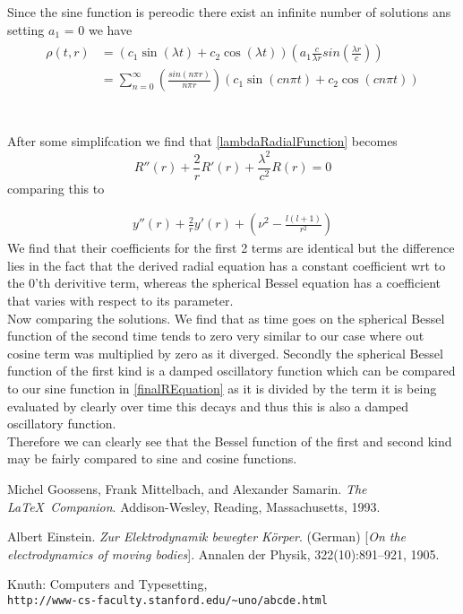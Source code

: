 \documentclass[10pt]{article}
\numberwithin{equation}{section}
\begin{document}
		Since the sine function is pereodic there exist an infinite number of solutions ans setting \(a_1\) = 0 we have
		\begin{align}\label{finalRho}
			\begin{split}
				\rho(t,r) &= (c_1 \sin(\lambda t) + c_2 \cos(\lambda t))\left(a_1\frac{c}{\lambda r}sin\left(\frac{\lambda r}{c}\right)\right)\\
				&= \sum_{n = 0}^{\infty} \left(\frac{sin\left(n \pi r\right)}{n \pi r}\right)\left(c_1 \sin(cn\pi t) + c_2 \cos(cn\pi t)\right)
			\end{split}
		\end{align}
		
		\section{}
		After some simplifcation we find that \ref{lambdaRadialFunction} becomes
		\begin{equation*}
			R''(r) + \frac{2}{r}R'(r) + \frac{\lambda^2}{c^2}R(r) = 0
		\end{equation*}
		comparing this to 
		
		\begin{align*}
			y''(r) + \frac{2}{r}y'(r) + \left(\nu^2 - \frac{l(l+1)}{r^2}\right)
		\end{align*}
		We find that their coefficients for the first 2 terms are identical but the difference lies in the fact that the derived radial equation has a constant coefficient wrt to the 0'th derivitive term, whereas the spherical Bessel equation has a coefficient that varies with respect to its parameter.\\ Now comparing the solutions. We find that as time goes on the spherical Bessel function of the second time tends to zero very similar to our case where out cosine term was multiplied by zero as it diverged. Secondly the spherical Bessel function of the first kind is a damped oscillatory function which can be compared to our	sine function in \ref{finalREquation} as it is divided by the term it is being evaluated by clearly over time this decays and thus this is also a damped oscillatory function.\\ Therefore we can clearly see that the Bessel function of the first and second kind may be fairly compared to sine and cosine functions.
		
		
		
		\begin{thebibliography}{9}
Michel Goossens, Frank Mittelbach, and Alexander Samarin. 
\textit{The \LaTeX\ Companion}. 
Addison-Wesley, Reading, Massachusetts, 1993.
 
Albert Einstein. 
\textit{Zur Elektrodynamik bewegter K{\"o}rper}. (German) 
[\textit{On the electrodynamics of moving bodies}]. 
Annalen der Physik, 322(10):891–921, 1905.
 
Knuth: Computers and Typesetting,
\\\texttt{http://www-cs-faculty.stanford.edu/\~{}uno/abcde.html}
\end{thebibliography}
	
	
\end{document}
